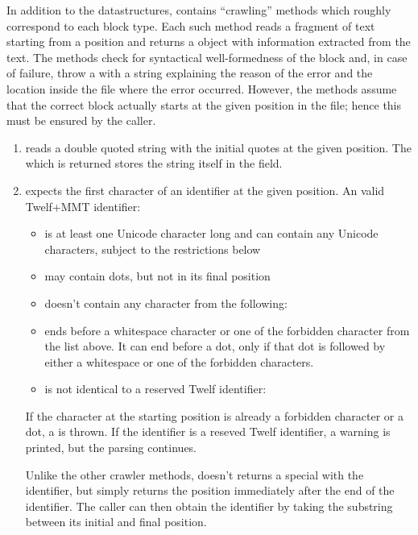 In addition to the datastructures,  contains ``crawling'' methods which roughly correspond to each block type. Each such method reads a fragment of text starting from a position and returns a  object with information extracted from the text. The methods check for syntactical well-formedness of the block and, in case of failure, throw a  with a string explaining the reason of the error and the location inside the file where the error occurred. However, the methods assume that the correct block actually starts at the given position in the file; hence this must be ensured by the caller. 
\begin{enumerate}
\item {} reads a double quoted string with the initial quotes at the given  position. The  which is returned stores the string itself in the  field.

\item {} expects the first character of an identifier at the given position. An valid Twelf+MMT identifier:
	\begin{itemize}
	\item is at least one Unicode character long and can contain any Unicode characters, subject to the  restrictions below
	\item may contain dots, but not in its final position
	\item doesn't contain any character from the following: 
	\item ends before a whitespace character or one of the forbidden character from the list above. It can end before a dot, only if that dot is followed by either a whitespace or one of the forbidden characters.
	\item is not identical to a reserved Twelf identifier: 
	\end{itemize}
	If the character at the starting position is already a forbidden character or a dot, a  is thrown. If the identifier is a reseved Twelf identifier, a warning is printed, but the parsing continues.

	Unlike the other crawler methods,  doesn't returns a special  with the identifier, but simply returns the position immediately after the end of the identifier. The caller can then obtain the identifier by taking the substring between its initial and final position.


\end{enumerate}
